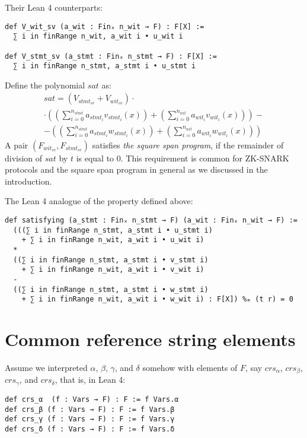 \documentclass{article}
\theoremstyle{definition}
\theoremstyle{remark}
\begin{document}
Their Lean 4 counterparts:
\begin{lstlisting}
def V_wit_sv (a_wit : Finₓ n_wit → F) : F[X] :=
  ∑ i in finRange n_wit, a_wit i • u_wit i

def V_stmt_sv (a_stmt : Finₓ n_stmt → F) : F[X] :=
  ∑ i in finRange n_stmt, a_stmt i • u_stmt i
\end{lstlisting}

Define the polynomial $sat$ as:
\begin{multline}
sat = (V_{{stmt}_{sv}} + V_{{wit}_{sv}}) \cdot \\ \cdot ((\sum \limits_{i = 0}^{n_{stmt}} a_{{stmt}_i} v_{{stmt}_i}(x)) + (\sum \limits_{i = 0}^{n_{wit}} a_{{wit}_i} v_{{wit}_i}(x) )) - \\ - ((\sum \limits_{i = 0}^{n_{stmt}} a_{{stmt}_i} w_{{stmt}_i}(x)) + (\sum \limits_{i = 0}^{n_{wit}} a_{{wit}_i} w_{{wit}_i}(x) ))
\end{multline}
A pair $(F_{{wit}_{sv}}, F_{{stmt}_{sv}})$ satisfies \emph{the square span program},
if the remainder of division of $sat$ by $t$ is equal to $0$.
This requirement is common for ZK-SNARK protocols and the square span program in general as we discussed in the introduction.

The Lean 4 analogue of the property defined above:
\begin{lstlisting}
def satisfying (a_stmt : Finₓ n_stmt → F) (a_wit : Finₓ n_wit → F) :=
  (((∑ i in finRange n_stmt, a_stmt i • u_stmt i)
    + ∑ i in finRange n_wit, a_wit i • u_wit i)
  *
  ((∑ i in finRange n_stmt, a_stmt i • v_stmt i)
    + ∑ i in finRange n_wit, a_wit i • v_wit i)
  -
  ((∑ i in finRange n_stmt, a_stmt i • w_stmt i)
    + ∑ i in finRange n_wit, a_wit i • w_wit i) : F[X]) %ₘ (t r) = 0
\end{lstlisting}

\section{Common reference string elements}

Assume we interpreted $\alpha$, $\beta$, $\gamma$, and $\delta$ somehow with elements of $F$, say $crs_{\alpha}$, $crs_{\beta}$, $crs_{\gamma}$, and $crs_{\delta}$, that is, in Lean 4:

\begin{lstlisting}
def crs_α  (f : Vars → F) : F := f Vars.α
def crs_β (f : Vars → F) : F := f Vars.β
def crs_γ (f : Vars → F) : F := f Vars.γ
def crs_δ (f : Vars → F) : F := f Vars.δ
\end{lstlisting}
\end{document}
